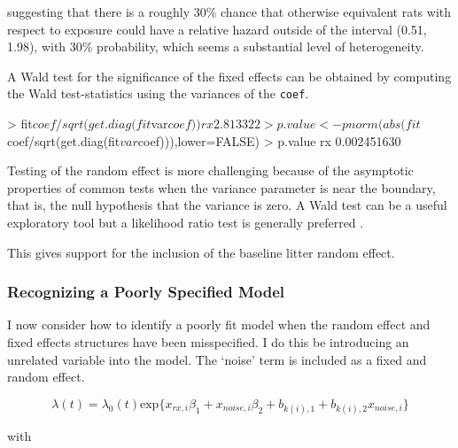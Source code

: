 \noindent suggesting that there is a roughly 30\% chance that
otherwise equivalent rats with respect to exposure could have a
relative hazard outside of the interval (0.51, 1.98), with 30\%
probability, which seems a substantial level of heterogeneity.

A Wald test for the significance of the fixed effects can be obtained
by computing the Wald test-statistics using the variances of the
\texttt{coef}.

\begin{Schunk}
\begin{Sinput}
> fit$coef/sqrt(get.diag(fit$var$coef))
      rx 
2.813322 

> p.value <- pnorm(abs(fit$coef/sqrt(get.diag(fit$var$coef))),lower=FALSE)
> p.value
         rx 
0.002451630 
\end{Sinput}
\end{Schunk}

Testing of the random effect is more challenging because of the
asymptotic properties of common tests when the variance parameter is
near the boundary, that is, the null hypothesis that the variance is
zero. A Wald test can be a useful exploratory tool but a likelihood
ratio test is generally preferred \cite{Self1987a}.

\begin{Schunk}
\end{Schunk}

This gives support for the inclusion of the baseline litter random
effect. 

\subsubsection{Recognizing a Poorly Specified Model}

I now consider how to identify a poorly fit model when the random
effect and fixed effects structures have been misspecified. I do this
be introducing an unrelated variable into the model. The `noise' term
is included as a fixed and random effect.

\begin{equation}
\label{eq:uni}
\lambda(t) = \lambda_0(t) \mbox{exp}\lbrace x_{rx,i} \beta_1 +
x_{noise,i} \beta_2 + b_{k(i),1} +  b_{k(i),2} x_{noise,i} \rbrace
\end{equation}

\noindent with 

